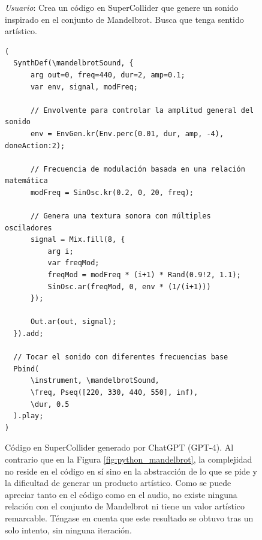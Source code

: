 \begin{figure}%
  \caption[Código en SuperCollider generado por ChatGPT (GPT-4)]{Código en SuperCollider generado por ChatGPT (GPT-4). Al contrario que en la Figura \ref{fig:python_mandelbrot}, la complejidad no reside en el código en sí sino en la abstracción de lo que se pide y la dificultad de generar un producto artístico. Como se puede apreciar tanto en el código como en el audio, no existe ninguna relación con el conjunto de Mandelbrot ni tiene un valor artístico remarcable. Téngase en cuenta que este resultado se obtuvo tras un solo intento, sin ninguna iteración.}
  \vspace{-.5cm}
  \vspace{.2cm}
  \centering
    \begin{mdframed}
      \fontsize{9.5pt}{11pt}\selectfont
      \emph{Usuario}: Crea un código en SuperCollider que genere un sonido inspirado en el conjunto de Mandelbrot. Busca que tenga sentido artístico.
    \end{mdframed}
    \centering
      \begin{lstlisting}[style=SuperCollider-IDE, basicstyle=\footnotesize\ttfamily, numbers=none]
(
  SynthDef(\mandelbrotSound, {
      arg out=0, freq=440, dur=2, amp=0.1;
      var env, signal, modFreq;
  
      // Envolvente para controlar la amplitud general del sonido
      env = EnvGen.kr(Env.perc(0.01, dur, amp, -4), doneAction:2);
  
      // Frecuencia de modulación basada en una relación matemática
      modFreq = SinOsc.kr(0.2, 0, 20, freq);
  
      // Genera una textura sonora con múltiples osciladores
      signal = Mix.fill(8, {
          arg i;
          var freqMod;
          freqMod = modFreq * (i+1) * Rand(0.9!2, 1.1);
          SinOsc.ar(freqMod, 0, env * (1/(i+1)))
      });
  
      Out.ar(out, signal);
  }).add;
  
  // Tocar el sonido con diferentes frecuencias base
  Pbind(
      \instrument, \mandelbrotSound,
      \freq, Pseq([220, 330, 440, 550], inf),
      \dur, 0.5
  ).play;
)       
      \end{lstlisting}
  
  \source{\propio}
  \label{fig:supercollider_mandelbrot}
\end{figure}


